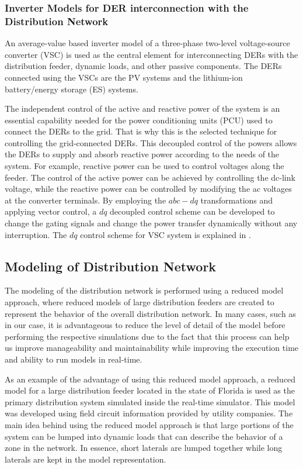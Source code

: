 \subsubsection{Inverter Models for DER interconnection with the Distribution Network }An average-value based inverter model of a three-phase two-level voltage-source converter (VSC) is used as the central element for interconnecting DERs with the distribution feeder, dynamic loads, and other passive components. The DERs connected using the VSCs are the PV systems and the lithium-ion battery/energy storage (ES) systems. 

The independent control of the active and reactive power of the system is an essential capability needed for the power conditioning units (PCU) used to connect the DERs to the grid. That is why this is the selected technique for controlling the grid-connected DERs. This decoupled control of the powers allows the DERs to supply and absorb reactive power according to the needs of the system. For example, reactive power can be used to control voltages along the feeder. The control of the active power can be achieved by controlling the dc-link voltage, while the reactive power can be controlled by modifying the ac voltages at the converter terminals. By employing the \(abc-dq\) transformations and applying vector control, a \(dq\) decoupled control scheme can be developed to change the gating signals and change the power transfer dynamically without any interruption. The \(dq\) control scheme for VSC system is explained in \cite{yazdani}. 




\subsection{Modeling of Distribution Network}
The modeling of the distribution network is performed using a reduced model approach, where reduced models of large distribution feeders are created to represent the behavior of the overall distribution network. In many cases, such as in our case, it is advantageous to reduce the level of detail of the model before performing the respective simulations due to the fact that this process can help us improve manageability and maintainability while improving the execution time and ability to run models in real-time. 

As an example of the advantage of using this reduced model approach, a reduced model for a large distribution feeder located in the state of Florida is used as the primary distribution system simulated inside the real-time simulator. This model was developed using field circuit information provided by utility companies. The main idea behind using the reduced model approach is that large portions of the system can be lumped into dynamic loads that can describe the behavior of a zone in the network. In essence, short laterals are lumped together while long laterals are kept in the model representation.

